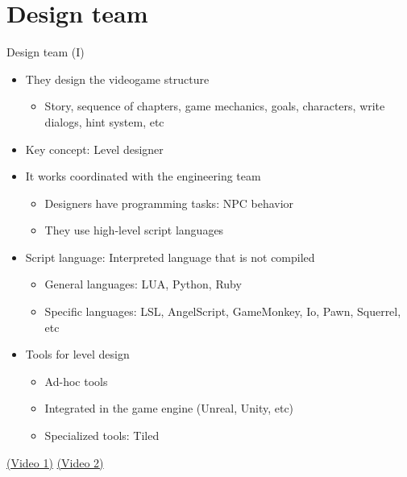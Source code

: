 \documentclass[10pt,compress]{beamer} %
\begin{document}
\section{Design team}
\begin{frame}{Design team (I)}
	\begin{itemize}
	\item They design the videogame structure
		\begin{itemize}
		\item Story, sequence of chapters, game mechanics, goals, characters, write dialogs, hint system, etc
		\end{itemize}
	\item Key concept: \alert{Level designer}
	\item It works coordinated with the engineering team
		\begin{itemize}
		\item Designers have programming tasks: NPC behavior
		\item They use high-level script languages
		\end{itemize}
	\item Script language: Interpreted language that is not compiled
		\begin{itemize}
		\item General languages: LUA, Python, Ruby
		\item Specific languages: LSL, AngelScript, GameMonkey, Io, Pawn, Squerrel, etc
		\end{itemize}
    \item Tools for level design
        \begin{itemize}
            \item Ad-hoc tools
            \item Integrated in the game engine (Unreal, Unity, etc)
            \item Specialized tools: Tiled
        \end{itemize}
	\end{itemize}
	\href{http://www.youtube.com/watch?v=KoEGyk6amq0}{(Video 1)} \href{http://www.youtube.com/watch?v=ELKi3hJkSwE}{(Video 2)} 
\end{frame}
\end{document}

